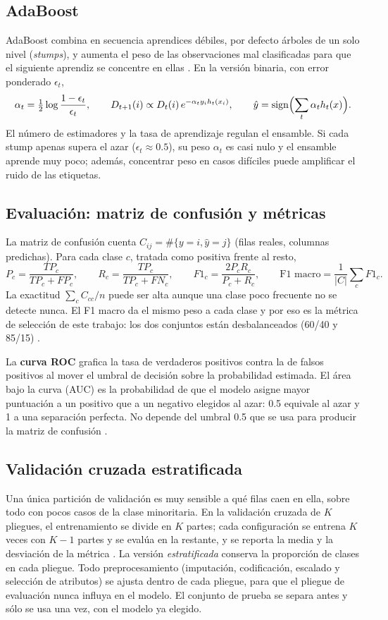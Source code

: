 \documentclass[11pt]{article}
\begin{document}
\subsection{AdaBoost}
AdaBoost combina en secuencia aprendices débiles, por defecto árboles de un solo
nivel (\emph{stumps}), y aumenta el peso de las observaciones mal clasificadas para
que el siguiente aprendiz se concentre en ellas \cite{freund,sklearnada}. En la
versión binaria, con error ponderado $\epsilon_t$,
\[
 \alpha_t=\tfrac12\log\frac{1-\epsilon_t}{\epsilon_t},\qquad
 D_{t+1}(i)\propto D_t(i)\,e^{-\alpha_t y_i h_t(x_i)},\qquad
 \hat y=\operatorname{sign}\Bigl(\sum_t\alpha_t h_t(x)\Bigr).
\]
El número de estimadores y la tasa de aprendizaje regulan el ensamble. Si cada stump
apenas supera el azar ($\epsilon_t\approx0.5$), su peso $\alpha_t$ es casi nulo y el
ensamble aprende muy poco; además, concentrar peso en casos difíciles puede
amplificar el ruido de las etiquetas.

\subsection{Evaluación: matriz de confusión y métricas}
La matriz de confusión cuenta $C_{ij}=\#\{y=i,\hat y=j\}$ (filas reales, columnas
predichas). Para cada clase $c$, tratada como positiva frente al resto,
\[
 P_c=\frac{TP_c}{TP_c+FP_c},\qquad
 R_c=\frac{TP_c}{TP_c+FN_c},\qquad
 F1_c=\frac{2P_cR_c}{P_c+R_c},\qquad
 \text{F1 macro}=\frac1{|C|}\sum_c F1_c .
\]
La exactitud $\sum_c C_{cc}/n$ puede ser alta aunque una clase poco frecuente no se
detecte nunca. El F1 macro da el mismo peso a cada clase y por eso es la métrica de
selección de este trabajo: los dos conjuntos están desbalanceados (60/40 y 85/15)
\cite{sklearnmetrics,hegarcia}.

La \textbf{curva ROC} grafica la tasa de verdaderos positivos contra la de falsos
positivos al mover el umbral de decisión sobre la probabilidad estimada. El área
bajo la curva (AUC) es la probabilidad de que el modelo asigne mayor puntuación a un
positivo que a un negativo elegidos al azar: 0.5 equivale al azar y 1 a una
separación perfecta. No depende del umbral 0.5 que se usa para producir la matriz
de confusión \cite{fawcett}.

\subsection{Validación cruzada estratificada}
Una única partición de validación es muy sensible a qué filas caen en ella,
sobre todo con pocos casos de la clase minoritaria. En la validación cruzada de $K$
pliegues, el entrenamiento se divide en $K$ partes; cada configuración se entrena $K$
veces con $K-1$ partes y se evalúa en la restante, y se reporta la media y la
desviación de la métrica \cite{kohavi,sklearncv}. La versión \emph{estratificada}
conserva la proporción de clases en cada pliegue. Todo preprocesamiento (imputación,
codificación, escalado y selección de atributos) se ajusta dentro de cada pliegue,
para que el pliegue de evaluación nunca influya en el modelo. El conjunto de prueba
se separa antes y sólo se usa una vez, con el modelo ya elegido.
\end{document}
